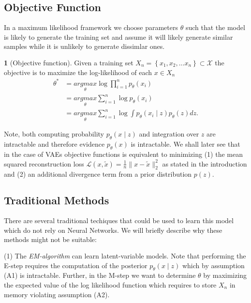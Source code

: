 \documentclass[11pt]{article}
\theoremstyle{plain}
\theoremstyle{definition}
\newtheorem{defn}[thm]{\protect\definitionname}
\theoremstyle{plain}
\providecommand{\definitionname}{Definition}
\begin{document}
\subsection{Objective Function}

In a maximum likelihood framework we choose parameters $\theta$ such
that the model is likely to generate the training set and assume it
will likely generate similar samples while it is unlikely to generate
dissimlar ones.
\begin{defn}[Objective function]
Given a training set $X_{n}=\left\{ x_{1},x_{2},\ldots x_{n}\right\} \subset\mathcal{X}$
the objective is to maximize the log-likelihood of each $x\in X_{n}$
\begin{equation}
\begin{aligned}\theta^{*} & =\underset{\theta}{argmax}\log\prod_{i=1}^{n}p_{\theta}(x_{i})\\
 & =\underset{\theta}{argmax}\sum_{i=1}^{n}\log p_{\theta}(x_{i})\\
 & =\underset{\theta}{argmax}\sum_{i=1}^{n}\log\int p_{\theta}(x_{i}\mid z)p_{\theta}(z)dz.
\end{aligned}
\label{eq:log_like}
\end{equation}

Note, both computing probability $p_{\theta}(x\mid z)$
and integration over $z$ are intractable and therefore evidence $p_{\theta}(x)$
is intractable. We shall later see that in the case of VAEs objective
functions is equivalent to minimizing (1) the mean squared reconstruction
loss $\mathcal{L}(x,\tilde{x})=\frac{1}{n}\lVert x-\tilde{x}\rVert_{2}^{2}$
as stated in the introduction and (2) an additional divergence term
from a prior distribution $p(z)$.
\end{defn}

\subsection{Traditional Methods}

There are several traditional techiques that could be used to learn
this model which do not rely on Neural Networks. We will briefly describe
why these methods might not be suitable:

(1) The \textit{EM-algorithm} can learn latent-variable models. Note
that performing the E-step requires the computation of the posterior
$p_{\theta}(x\mid z)$ which by assumption (A1) is intractable. Further,
in the M-step we want to determine $\theta$ by maximizing the expected
value of the log likelihood function which requires to store $X_{n}$
in memory violating assumption (A2).
\end{document}
